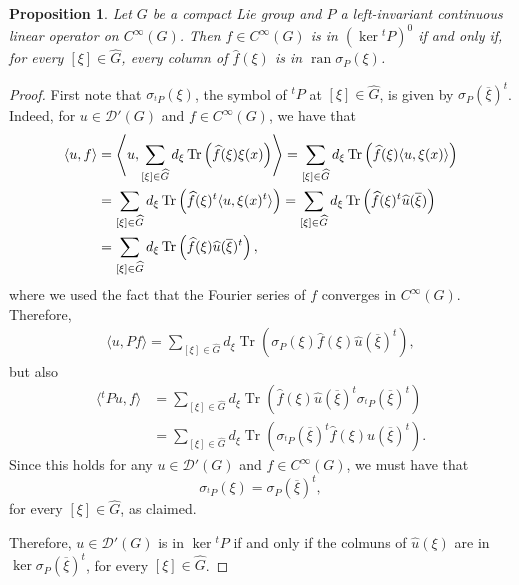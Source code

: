 \documentclass[11pt]{amsart}
\numberwithin{theorem}{section}
\numberwithin{equation}{section}
\newtheorem{prop}[theorem]{Proposition}
\theoremstyle{definition}
\numberwithin{example}{section}
\theoremstyle{definition}
\theoremstyle{definition}
\newcommand{\Tr}{\operatorname{Tr}}
\begin{document}
\begin{prop}\label{prop_kernel_annihi_range}
    Let $G$ be a compact Lie group and $P$ a left-invariant continuous linear operator on $C^\infty(G)$. Then $f\in C^\infty(G)$ is in $(\ker {}^tP)^{0}$ if and only if, for every $[\xi]\in\widehat{G}$, 
    every column of $\widehat{f}(\xi)$ is in  $\operatorname{ran}\sigma_P(\xi)$.
\end{prop}
\begin{proof}
    First note that $\sigma_{{}^tP}(\xi)$, the symbol of ${}^tP$ at $[\xi]\in\widehat{G}$, is given by $\sigma_P(\overline{\xi})^{t}$. Indeed, for $u\in\mathcal{D}'(G)$ and $f\in C^\infty(G)$, we have that
\begin{align}\label{eq_Fourier_duality}
    \langle u ,f \rangle&=\left\langle u,\sum_{[\xi]\in\widehat{G}}d_\xi \Tr\left(\widehat{f}(\xi)\xi(x)\right)\right\rangle=\sum_{[\xi]\in\widehat{G}}d_\xi \Tr\left(\widehat{f}(\xi)\langle u,\xi(x)\rangle\right)\notag\\
    &=\sum_{[\xi]\in\widehat{G}}d_\xi \Tr\left(\widehat{f}(\xi)^t\langle u,{\xi}(x)^t\rangle\right)=\sum_{[\xi]\in\widehat{G}}d_\xi \Tr\left(\widehat{f}(\xi)^t\widehat{u}(\overline{\xi})\right)\notag\\
    &=\sum_{[\xi]\in\widehat{G}}d_\xi \Tr\left(\widehat{f}(\xi)\widehat{u}(\overline{\xi})^t\right),
\end{align}
where we used the fact that the Fourier series of $f$ converges in $C^\infty(G)$.
Therefore, 
\begin{align*}
    \langle u,Pf\rangle=\sum_{[\xi]\in\widehat{G}}d_\xi \Tr\left(\sigma_{P}(\xi)\widehat{f}(\xi)\widehat{u}(\overline{\xi})^t\right),
\end{align*}
but also
\begin{align*}
     \langle {}^tPu,f\rangle&=\sum_{[\xi]\in\widehat{G}}d_\xi \Tr\left(\widehat{f}(\xi)\widehat{u}(\overline{\xi})^t\sigma_{{}^tP}(\overline{\xi})^t\right)\\
     &=\sum_{[\xi]\in\widehat{G}}d_\xi \Tr\left(\sigma_{{}^tP}(\overline{\xi})^t\widehat{f}(\xi)\widehat{u}(\overline{\xi})^t\right).
\end{align*}  
Since this holds for any $u\in\mathcal{D}'(G)$ and $f\in C^\infty(G)$, we must have that
\begin{equation*}
    \sigma_{{}^tP}(\xi)=\sigma_{P}(\overline{\xi})^{t},
\end{equation*}
for every $[\xi]\in\widehat{G}$, as claimed.

Therefore, $u\in \mathcal{D}'(G)$ is in $\ker {}^tP$ if and only if the colmuns of $\widehat{u}(\xi)$ are in $\ker\sigma_P(\overline{\xi})^t$, for every $[\xi]\in\widehat{G}$.
 


\end{proof}
\end{document}
